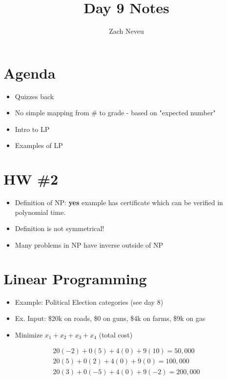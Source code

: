 \documentclass[12pt, letter]{article}
\author{Zach Neveu}
\title{ Day 9 Notes }
\begin{document}
\maketitle

\section{Agenda}%
\label{sec:agenda}
\begin{itemize}
	\item Quizzes back
	\item No simple mapping from \# to grade - based on "expected number"
	\item Intro to LP
	\item Examples of LP
\end{itemize}

\section{HW \#2}%
\label{sec:hw_#2}
\begin{itemize}
	\item Definition of NP: \textbf{yes} example has certificate which can be verified in polynomial time.
	\item Definition is not symmetrical! 
	\item Many problems in NP have inverse outside of NP
\end{itemize}

\section{Linear Programming}%
\label{sec:linear_programming}
\begin{itemize}
	\item Example: Political Election categories (see day 8)
	\item Ex. Input: \$20k on roads, \$0 on guns, \$4k on farms, \$9k on gas
	\item Minimize $x_1 + x_2 + x_3 + x_4$ (total cost)
\end{itemize}

\begin{center}
\begin{gather*}
20(-2)+0(5)+4(0)+9(10) = 50,000 \\
20(5)+0(2)+4(0)+9(0) = 100,000 \\
20(3)+0(-5)+4(0)+9(-2) = 200,000 \\
\end{gather*}
\end{center}
\end{document}
